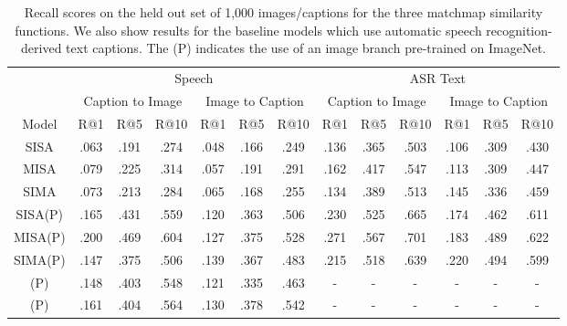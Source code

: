 \begin{table}[htb]
\setlength\tabcolsep{2pt}
\small
  \caption[Recall scores]{Recall scores on the held out set of 1,000 images/captions for the three matchmap similarity functions. We also show results for the baseline models which use automatic speech recognition-derived text captions. The (P) indicates the use of an image branch pre-trained on ImageNet.}
  \label{tab:retrieval_algos}
  \centering
  \begin{tabular}{ccccccccccccc}
    \toprule
    \multicolumn{1}{c}{} & \multicolumn{6}{c}{Speech} & \multicolumn{6}{c}{ASR Text} \\
    \multicolumn{1}{c}{} & \multicolumn{3}{c}{Caption to Image} & \multicolumn{3}{c}{Image to Caption}& \multicolumn{3}{c}{Caption to Image} & \multicolumn{3}{c}{Image to Caption}\\
    Model & R@1 & R@5 & R@10 & R@1 & R@5 & R@10 & R@1 & R@5 & R@10 & R@1 & R@5 & R@10\\
    \cmidrule(lr){2-4}\cmidrule(lr){5-7}\cmidrule(lr){8-10}\cmidrule(lr){11-13}
    SISA & .063 & .191 & .274 & .048 & .166 & .249 & .136 & .365 & .503 & .106 & .309 & .430 \\
    MISA & .079 & .225 & .314 & .057 & .191 & .291 & .162 & .417 & .547 & .113 & .309 & .447 \\
    SIMA & .073 & .213 & .284 & .065 & .168 & .255 & .134 & .389 & .513 & .145 & .336 & .459 \\
    \midrule
    SISA(P) & .165 & .431 & .559 & .120 & .363 & .506 & .230 & .525 & .665 & .174 & .462 & .611 \\
    MISA(P) & .200 & .469 & .604 & .127 & .375 & .528 & .271 & .567 & .701 & .183 & .489 & .622 \\
    SIMA(P) & .147 & .375 & .506 & .139 & .367 & .483 & .215 & .518 & .639 & .220 & .494 & .599 \\
    \midrule
    \cite{harwath_nips}(P)& .148 & .403 & .548 & .121 & .335 & .463 & - & - & - &- &- &- \\
    \cite{harwath_acl_2017}(P)& .161 & .404 & .564 & .130 & .378 &  .542 & - & - & - &- &- &-\\
    \bottomrule
  \end{tabular}
\end{table}

